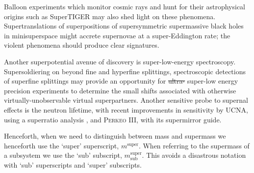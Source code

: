 Balloon experiments which monitor cosmic rays and hunt for their astrophysical origins such as SuperTIGER\cite{Binns:2014xpa} may also shed light on these phenomena.
Supertranslations of superpositions of supersymmetric supermassive black holes in minisuperspace might accrete supernovae at a super-Eddington rate; the violent phenomena should produce clear signatures.

Another superpotential avenue of discovery is super-low-energy spectroscopy.
Supersoldiering on beyond fine and hyperfine splittings, spectroscopic detections of superfine splittings may provide an opportunity for \st{ultra-} super-low energy precision experiments to determine the small shifts associated with otherwise virtually-unobservable virtual superpartners.
Another sensitive probe to supernal effects is the neutron lifetime, with recent improvements in sensitivity by UCNA, using a superratio analysis \cite{Brown:2017mhw}, and P\textsc{erkeo} III, with its supermirror guide\cite{Markisch:2018ndu}.

Henceforth, when we need to distinguish between mass and supermass we henceforth use the `super' superscript, $m^{\text{super}}$.  When referring to the supermass of a subsystem we use the `sub' subscript, $m^{\text{super}}_{\text{sub}}$.  This avoids a disastrous notation with `sub' superscripts and `super' subscripts.
